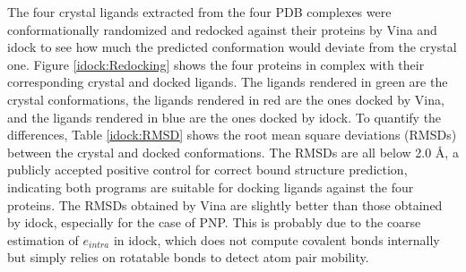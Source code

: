 The four crystal ligands extracted from the four PDB complexes were conformationally randomized and redocked against their proteins by Vina and idock to see how much the predicted conformation would deviate from the crystal one. Figure \ref{idock:Redocking} shows the four proteins in complex with their corresponding crystal and docked ligands. The ligands rendered in green are the crystal conformations, the ligands rendered in red are the ones docked by Vina, and the ligands rendered in blue are the ones docked by idock. To quantify the differences, Table \ref{idock:RMSD} shows the root mean square deviations (RMSDs) between the crystal and docked conformations. The RMSDs are all below 2.0 \AA, a publicly accepted positive control for correct bound structure prediction, indicating both programs are suitable for docking ligands against the four proteins. The RMSDs obtained by Vina are slightly better than those obtained by idock, especially for the case of PNP. This is probably due to the coarse estimation of $e_{intra}$ in idock, which does not compute covalent bonds internally but simply relies on rotatable bonds to detect atom pair mobility.

